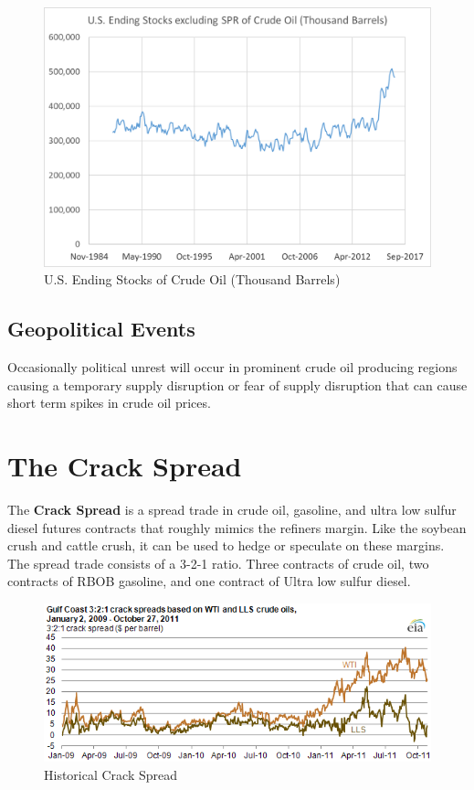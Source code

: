 \documentclass[]{book}
\theoremstyle{definition}
\theoremstyle{definition}
\theoremstyle{remark}
\begin{document}
\begin{figure}[htbp]
\centering
\includegraphics{Excel-files/CrudeOiland-crudeoil_files/image007.png}
\caption{U.S. Ending Stocks of Crude Oil (Thousand Barrels)}
\end{figure}

\subsection{Geopolitical Events}\label{geopolitical-events}

Occasionally political unrest will occur in prominent crude oil
producing regions causing a temporary supply disruption or fear of
supply disruption that can cause short term spikes in crude oil prices.

\section{The Crack Spread}\label{the-crack-spread}

The \textbf{Crack Spread} is a spread trade in crude oil, gasoline, and
ultra low sulfur diesel futures contracts that roughly mimics the
refiners margin. Like the soybean crush and cattle crush, it can be used
to hedge or speculate on these margins. The spread trade consists of a
3-2-1 ratio. Three contracts of crude oil, two contracts of RBOB
gasoline, and one contract of Ultra low sulfur diesel.

\begin{figure}[htbp]
\centering
\includegraphics{images/CrackSpreadChange.png}
\caption{Historical Crack Spread}
\end{figure}
\end{document}
